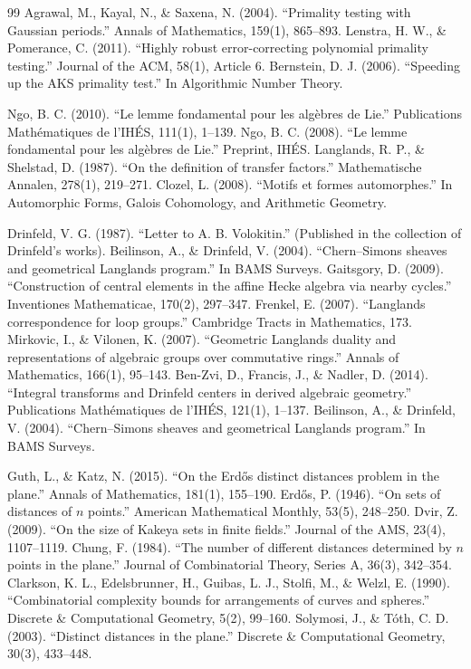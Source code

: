 \begin{thebibliography}{99}
 Agrawal, M., Kayal, N., \& Saxena, N. (2004). ``Primality testing with Gaussian periods.'' Annals of Mathematics, 159(1), 865--893.
 Lenstra, H. W., \& Pomerance, C. (2011). ``Highly robust error-correcting polynomial primality testing.'' Journal of the ACM, 58(1), Article 6.
 Bernstein, D. J. (2006). ``Speeding up the AKS primality test.'' In Algorithmic Number Theory.

 Ngo, B. C. (2010). ``Le lemme fondamental pour les alg\`ebres de Lie.'' Publications Math\'ematiques de l'IH\'ES, 111(1), 1--139.
 Ngo, B. C. (2008). ``Le lemme fondamental pour les alg\`ebres de Lie.'' Preprint, IH\'ES.
 Langlands, R. P., \& Shelstad, D. (1987). ``On the definition of transfer factors.'' Mathematische Annalen, 278(1), 219--271.
 Clozel, L. (2008). ``Motifs et formes automorphes.'' In Automorphic Forms, Galois Cohomology, and Arithmetic Geometry.

 Drinfeld, V. G. (1987). ``Letter to A. B. Volokitin.'' (Published in the collection of Drinfeld's works).
 Beilinson, A., \& Drinfeld, V. (2004). ``Chern--Simons sheaves and geometrical Langlands program.'' In BAMS Surveys.
 Gaitsgory, D. (2009). ``Construction of central elements in the affine Hecke algebra via nearby cycles.'' Inventiones Mathematicae, 170(2), 297--347.
 Frenkel, E. (2007). ``Langlands correspondence for loop groups.'' Cambridge Tracts in Mathematics, 173.
 Mirkovic, I., \& Vilonen, K. (2007). ``Geometric Langlands duality and representations of algebraic groups over commutative rings.'' Annals of Mathematics, 166(1), 95--143.
 Ben-Zvi, D., Francis, J., \& Nadler, D. (2014). ``Integral transforms and Drinfeld centers in derived algebraic geometry.'' Publications Math\'ematiques de l'IH\'ES, 121(1), 1--137.
 Beilinson, A., \& Drinfeld, V. (2004). ``Chern--Simons sheaves and geometrical Langlands program.'' In BAMS Surveys.

 Guth, L., \& Katz, N. (2015). ``On the Erd\H{o}s distinct distances problem in the plane.'' Annals of Mathematics, 181(1), 155--190.
 Erd\H{o}s, P. (1946). ``On sets of distances of $n$ points.'' American Mathematical Monthly, 53(5), 248--250.
 Dvir, Z. (2009). ``On the size of Kakeya sets in finite fields.'' Journal of the AMS, 23(4), 1107--1119.
 Chung, F. (1984). ``The number of different distances determined by $n$ points in the plane.'' Journal of Combinatorial Theory, Series A, 36(3), 342--354.
 Clarkson, K. L., Edelsbrunner, H., Guibas, L. J., Stolfi, M., \& Welzl, E. (1990). ``Combinatorial complexity bounds for arrangements of curves and spheres.'' Discrete \& Computational Geometry, 5(2), 99--160.
 Solymosi, J., \& T\'oth, C. D. (2003). ``Distinct distances in the plane.'' Discrete \& Computational Geometry, 30(3), 433--448.


\end{thebibliography}

